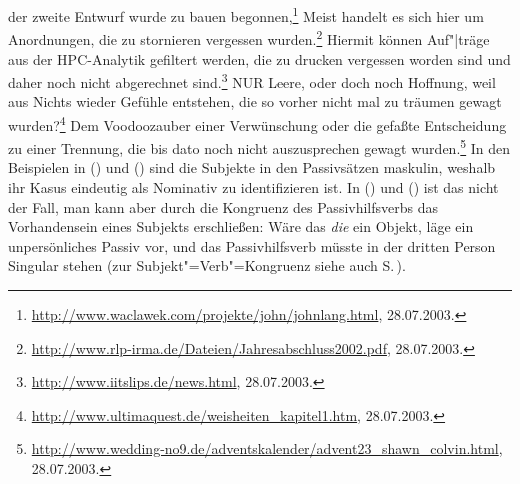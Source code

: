 \ea
\label{bsp-wurde-zu-bauen-begonnen}%
der zweite Entwurf wurde zu bauen begonnen,\footnote{
\url{http://www.waclawek.com/projekte/john/johnlang.html}, 28.07.2003.
}
\z
\eal
\ex Meist handelt es sich hier um Anordnungen, die zu stornieren vergessen wurden.\footnote{
        \url{http://www.rlp-irma.de/Dateien/Jahresabschluss2002.pdf}, 28.07.2003.
}
\ex Hiermit können Auf"|träge aus der HPC-Analytik gefiltert werden, die zu drucken vergessen worden sind 
    und daher noch nicht abgerechnet sind.\footnote{
        \url{http://www.iitslips.de/news.html}, 28.07.2003.
}
\zl
\eal
\ex NUR Leere, oder doch noch Hoffnung, weil aus Nichts wieder Gefühle entstehen,
    die so vorher nicht mal zu träumen gewagt wurden?\footnote{
        \url{http://www.ultimaquest.de/weisheiten_kapitel1.htm}, 28.07.2003.
}
\ex Dem Voodoozauber einer Verwünschung oder die gefaßte Entscheidung zu einer Trennung,
    die bis dato noch nicht auszusprechen gewagt wurden.\footnote{
        \url{http://www.wedding-no9.de/adventskalender/advent23_shawn_colvin.html}, 28.07.2003.
}
\zl
%
In den Beispielen in () und () sind die Subjekte in den Passivsätzen
maskulin, weshalb ihr Kasus eindeutig als Nominativ zu identifizieren ist. In () und
() ist das nicht der Fall, man kann aber durch die Kongruenz des Passivhilfsverbs
das Vorhandensein eines Subjekts erschließen: Wäre das \emph{die} ein Objekt,
läge ein unpersönliches Passiv vor, und das Passivhilfsverb müsste in der dritten Person
Singular stehen (zur Subjekt"=Verb"=Kongruenz siehe auch S.\,\pageref{bsp-kongruenz-passiv}).

